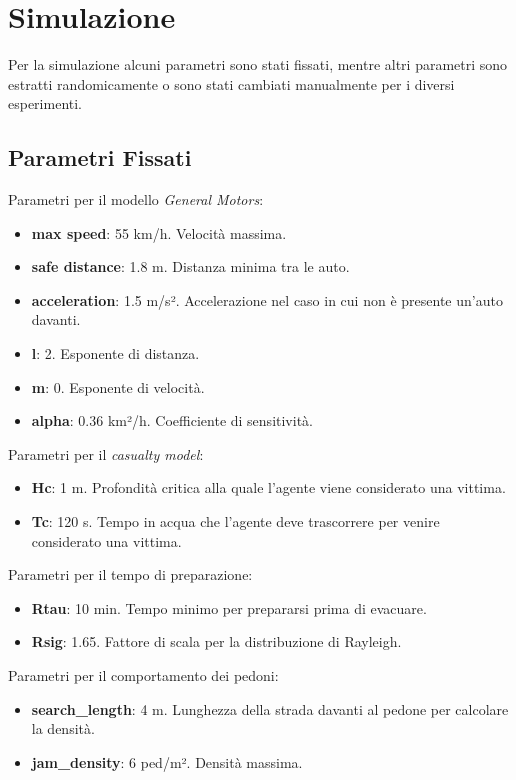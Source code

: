 \section{Simulazione}
\label{sec:simulazione}
Per la simulazione alcuni parametri sono stati fissati, mentre altri parametri sono estratti randomicamente 
o sono stati cambiati manualmente per i diversi esperimenti.

\subsection{Parametri Fissati}
\label{ssec:parametri-fissi}

Parametri per il modello \textit{General Motors}:
\begin{itemize}
    \item \textbf{max speed}: 55 km/h. Velocità massima.
    \item \textbf{safe distance}: 1.8 m. Distanza minima tra le auto.
    \item \textbf{acceleration}: 1.5 m/s². Accelerazione nel caso in cui non è presente un'auto davanti.
    \item \textbf{l}: 2. Esponente di distanza.
    \item \textbf{m}: 0. Esponente di velocità.
    \item \textbf{alpha}: 0.36 km²/h. Coefficiente di sensitività. 
\end{itemize}

\noindent
Parametri per il \textit{casualty model}:
\begin{itemize}
  \item \textbf{Hc}: 1 m. Profondità critica alla quale l'agente viene considerato una vittima.
  \item \textbf{Tc}: 120 s. Tempo in acqua che l'agente deve trascorrere per venire considerato una vittima. 
\end{itemize}

\noindent
Parametri per il tempo di preparazione:
\begin{itemize}
  \item \textbf{Rtau}: 10 min. Tempo minimo per prepararsi prima di evacuare.
  \item \textbf{Rsig}: 1.65. Fattore di scala per la distribuzione di Rayleigh.
\end{itemize}

\noindent
Parametri per il comportamento dei pedoni:
\begin{itemize}
  \item \textbf{search\_length}: 4 m. Lunghezza della strada davanti al pedone per calcolare la densità.
  \item \textbf{jam\_density}: 6 ped/m². Densità massima.
\end{itemize}


